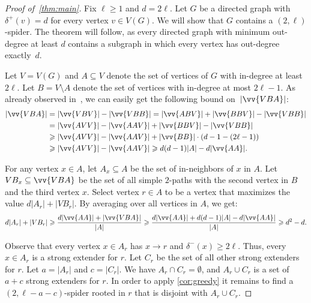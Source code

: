 \documentclass[a4paper,USenglish,cleveref,autoref,thm-restate,pdfa]{lipics-v2021}
\let\geq\geqslant
\let\ge\geqslant
\newcommand{\norm}[1]{{\left|#1\right|}}
\newcommand{\pathset}[1]{\vv{#1}}
\begin{document}
\begin{proof}[Proof of~\cref{thm:main}]
    Fix $\ell \ge 1$ and $d=2\ell$.
    Let $G$ be a directed graph with $\delta^+(v) = d$ for every vertex $v\in V(G)$.
    We will show that $G$ contains a $(2,\ell)$\nobreakdash-spider.
    The theorem will follow, as every directed graph with minimum out-degree at least $d$ contains a subgraph in which every vertex has out-degree exactly~$d$.

    Let $V=V(G)$ and $A\subseteq V$ denote the set of vertices of $G$ with in-degree at least $2\ell$.
    Let $B=V \setminus A$ denote the set of vertices with in-degree at most $2\ell-1$.
    As already observed in~\cite{hons2025unavoidable}, we can easily get the following bound on~$\norm{\pathset{VBA}}$:
    \begin{align*}
        \norm{\pathset{VBA}}
        &= \norm{\pathset{VBV}} - \norm{\pathset{VBB}} = \norm{\pathset{ABV}} + \norm{\pathset{BBV}} - \norm{\pathset{VBB}} \\
        &= \norm{\pathset{AVV}} - \norm{\pathset{AAV}} + \norm{\pathset{BBV}} - \norm{\pathset{VBB}} \\
        &\geq \norm{\pathset{AVV}} - \norm{\pathset{AAV}} + \norm{\pathset{BB}}\cdot(d-1 - (2\ell-1)) \\
        &\geq \norm{\pathset{AVV}} - \norm{\pathset{AAV}} \geq d(d-1)\norm{A} - d\norm{\pathset{AA}}\text{.}
    \end{align*}

    For any vertex $x \in A$, let $A_x \subseteq A$ be the set of in-neighbors of $x$ in $A$.
    Let $VB_x \subseteq \pathset{VBA}$ be the set of all simple $2$-paths with the second vertex in $B$ and the third vertex $x$.
    Select vertex $r \in A$ to be a vertex that maximizes the value $d\norm{A_r}+\norm{VB_r}$.
    By averaging over all vertices in $A$, we get:
    \[
        d\norm{A_r}+\norm{VB_r}
        \ge \frac{d\norm{\pathset{AA}}+\norm{\pathset{VBA}}}{\norm{A}}  
        \ge \frac{d\norm{\pathset{AA}} + d(d-1)\norm{A} - d\norm{\pathset{AA}}}{\norm{A}}
        \ge d^2 - d\text{.}
    \]

    Observe that every vertex $x \in A_r$ has $x \to r$ and $\delta^-(x)\ge 2\ell$.
    Thus, every $x \in A_r$ is a strong extender for $r$.
    Let $C_r$ be the set of all other strong extenders for $r$.
    Let $a=\norm{A_r}$ and $c=\norm{C_r}$. 
    We have $A_r \cap C_r = \emptyset$, and $A_r \cup C_r$ is a set of $a+c$ strong extenders for $r$.
    In order to apply \cref{cor:greedy} it remains to find a $(2,\ell-a-c)$\nobreakdash-spider rooted in $r$ that is disjoint with $A_r \cup C_r$. 




\end{proof}
\end{document}
